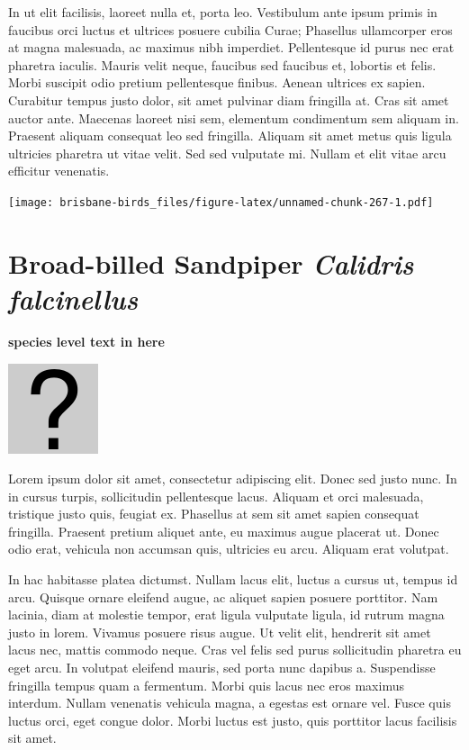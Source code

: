 \documentclass[]{book}
\let\origfigure\figure
\let\endorigfigure\endfigure
\renewenvironment{figure}[1][2] {
  \expandafter\origfigure\expandafter[H]
} {
  \endorigfigure
}
\begin{document}
In ut elit facilisis, laoreet nulla et, porta leo. Vestibulum ante ipsum
primis in faucibus orci luctus et ultrices posuere cubilia Curae;
Phasellus ullamcorper eros at magna malesuada, ac maximus nibh
imperdiet. Pellentesque id purus nec erat pharetra iaculis. Mauris velit
neque, faucibus sed faucibus et, lobortis et felis. Morbi suscipit odio
pretium pellentesque finibus. Aenean ultrices ex sapien. Curabitur
tempus justo dolor, sit amet pulvinar diam fringilla at. Cras sit amet
auctor ante. Maecenas laoreet nisi sem, elementum condimentum sem
aliquam in. Praesent aliquam consequat leo sed fringilla. Aliquam sit
amet metus quis ligula ultricies pharetra ut vitae velit. Sed sed
vulputate mi. Nullam et elit vitae arcu efficitur venenatis.

\begin{figure}
\centering
\texttt{[image: brisbane-birds\_files/figure-latex/unnamed-chunk-267-1.pdf]}
\caption{\label{fig:unnamed-chunk-267}insert figure caption}
\end{figure}

\section{\texorpdfstring{Broad-billed Sandpiper \emph{Calidris
falcinellus}}{Broad-billed Sandpiper Calidris falcinellus}}\label{broad-billed-sandpiper-calidris-falcinellus}

\textbf{species level text in here}

\begin{figure}
\centering
\includegraphics{assets/missing.png}
\caption{No image for species}
\end{figure}

Lorem ipsum dolor sit amet, consectetur adipiscing elit. Donec sed justo
nunc. In in cursus turpis, sollicitudin pellentesque lacus. Aliquam et
orci malesuada, tristique justo quis, feugiat ex. Phasellus at sem sit
amet sapien consequat fringilla. Praesent pretium aliquet ante, eu
maximus augue placerat ut. Donec odio erat, vehicula non accumsan quis,
ultricies eu arcu. Aliquam erat volutpat.

In hac habitasse platea dictumst. Nullam lacus elit, luctus a cursus ut,
tempus id arcu. Quisque ornare eleifend augue, ac aliquet sapien posuere
porttitor. Nam lacinia, diam at molestie tempor, erat ligula vulputate
ligula, id rutrum magna justo in lorem. Vivamus posuere risus augue. Ut
velit elit, hendrerit sit amet lacus nec, mattis commodo neque. Cras vel
felis sed purus sollicitudin pharetra eu eget arcu. In volutpat eleifend
mauris, sed porta nunc dapibus a. Suspendisse fringilla tempus quam a
fermentum. Morbi quis lacus nec eros maximus interdum. Nullam venenatis
vehicula magna, a egestas est ornare vel. Fusce quis luctus orci, eget
congue dolor. Morbi luctus est justo, quis porttitor lacus facilisis sit
amet.
\end{document}
